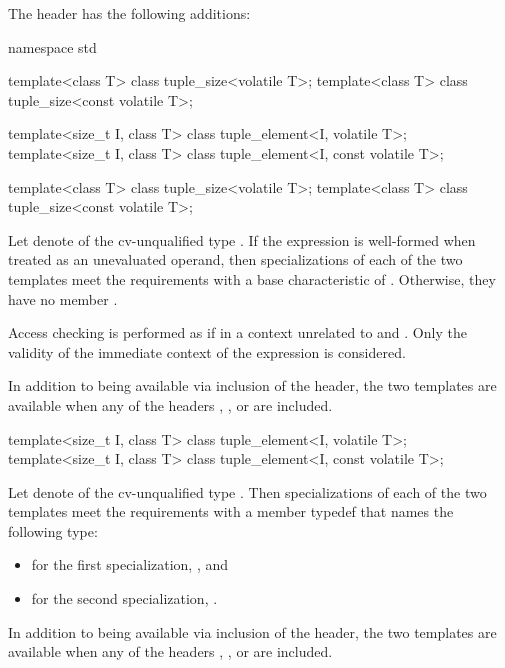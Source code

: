 \pnum
The header  has the following additions:

\begin{codeblock}
namespace std {
  template<class T> class tuple_size<volatile T>;
  template<class T> class tuple_size<const volatile T>;

  template<size_t I, class T> class tuple_element<I, volatile T>;
  template<size_t I, class T> class tuple_element<I, const volatile T>;
}
\end{codeblock}

\begin{itemdecl}
template<class T> class tuple_size<volatile T>;
template<class T> class tuple_size<const volatile T>;
\end{itemdecl}

\begin{itemdescr}
\pnum
Let  denote  of the cv-unqualified type .
If the expression  is well-formed
when treated as an unevaluated operand,
then specializations of each of the two templates meet
the  requirements with a base characteristic of
.
Otherwise, they have no member .

\pnum
Access checking is performed as if
in a context unrelated to  and .
Only the validity of the immediate context of the expression is considered.

\pnum
In addition to being available via inclusion of the  header,
the two templates are available when any of the headers
,
, or
are included.
\end{itemdescr}

\begin{itemdecl}
template<size_t I, class T> class tuple_element<I, volatile T>;
template<size_t I, class T> class tuple_element<I, const volatile T>;
\end{itemdecl}

\begin{itemdescr}
\pnum
Let  denote 
of the cv-unqualified type .
Then specializations of each of the two templates meet
the  requirements
with a member typedef  that names the following type:
\begin{itemize}
\item for the first specialization, , and
\item for the second specialization, .
\end{itemize}

\pnum
In addition to being available via inclusion of the  header,
the two templates are available when any of the headers
,
, or
are included.
\end{itemdescr}

